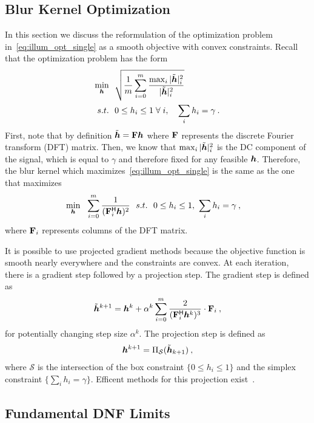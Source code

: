 \subsection{Blur Kernel Optimization} \label{sec:appendix:optimization_app}

In this section we discuss the reformulation of
the optimization problem in~\eqref{eq:illum_opt_single} as a smooth objective with convex constraints.
Recall that the optimization problem has the form
\begin{align*}
\min_{\bm{h}}&~~ \sqrt{\frac{1}{m} \sum_{i=0}^m \frac{\max_i{|\tilde{\bm{h}}|_i^2}}{|\tilde{\bm{h}}|_i^2}} \\
  s.t. &~~0 \leq h_i \leq 1 \; \forall \; i, \quad
  \sum_{i} h_i = \gamma \:.
\end{align*}
First, note that by definition $\tilde {\bm{h}}=\mathbf{F}\bm{h}$ where $\mathbf{F}$ represents the discrete Fourier transform (DFT) matrix.
Then, we know that $\max_i{|\tilde{\bm{h}}|_i^2}$ is the DC component of the signal, which is equal to $\gamma$ and therefore fixed for any feasible $\bm{h}$.
Therefore, the blur kernel which maximizes~\eqref{eq:illum_opt_single} is the same as the one that maximizes
\begin{align*}
\label{eq:opt_smooth}
\min_{\bm{h}}&~~ \sum_{i=0}^m \frac{1}{(\mathbf{F}_i^{\mathsf{H}}\bm{h})^2} ~~
  s.t. ~~0 \leq h_i \leq 1, ~
  \sum_{i} h_i = \gamma \:,
\end{align*}
where $\mathbf{F}_i$ represents columns of the DFT matrix.

It is possible to use projected gradient methods because the objective function is smooth nearly everywhere and the constraints are convex. At each iteration, there is a gradient step followed by a projection step.
The gradient step is defined as
\begin{align*}
    \tilde {\bm{h}}^{k+1} = \bm{h}^k + \alpha^k \sum_{i=0}^m   \frac{2}{(\mathbf{F}_i^{\mathsf{H}} \bm{h}^k)^{3}} \cdot \mathbf{F}_i\:,
\end{align*}
for potentially changing step size $\alpha^k$.
The projection step is defined as
\begin{align*}
    \bm{h}^{k+1} = \Pi_{\mathcal{S}}(\tilde {\bm{h}}_{k+1})\:,
\end{align*}
where $\mathcal{S}$ is the intersection of the box constraint $\{0\leq h_i\leq 1\}$ and the simplex constraint $\{\sum_i h_i = \gamma\}$. Efficent methods for this projection exist~\cite{gupta2010l1}.

\subsection{Fundamental DNF Limits}\label{sec:appendix:dnf_limit}

